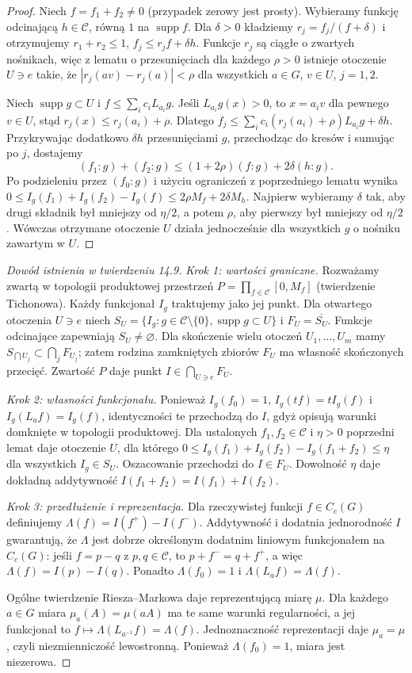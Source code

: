 \documentclass[11pt,a4paper]{article}
\numberwithin{equation}{section}
\theoremstyle{plain}
\theoremstyle{definition}
\theoremstyle{remark}
\newcommand{\supp}{\operatorname{supp}}
\begin{document}
\begin{proof}
Niech $f=f_1+f_2\ne0$ (przypadek zerowy jest prosty). Wybieramy funkcję odcinającą $h\in\mathcal C$, równą $1$ na $\supp f$. Dla $\delta>0$ kładziemy $r_j=f_j/(f+\delta)$ i otrzymujemy $r_1+r_2\le1$, $f_j\le r_jf+\delta h$. Funkcje $r_j$ są ciągłe o zwartych nośnikach, więc z lematu o przesunięciach dla każdego $\rho>0$ istnieje otoczenie $U\ni e$ takie, że $|r_j(av)-r_j(a)|<\rho$ dla wszystkich $a\in G$, $v\in U$, $j=1,2$.

Niech $\supp g\subset U$ i $f\le\sum_ic_iL_{a_i}g$. Jeśli $L_{a_i}g(x)>0$, to $x=a_iv$ dla pewnego $v\in U$, stąd $r_j(x)\le r_j(a_i)+\rho$. Dlatego
$f_j\le\sum_ic_i(r_j(a_i)+\rho)L_{a_i}g+\delta h$.
Przykrywając dodatkowo $\delta h$ przesunięciami $g$, przechodząc do kresów i sumując po $j$, dostajemy
\[
(f_1:g)+(f_2:g)\le(1+2\rho)(f:g)+2\delta(h:g).
\]
Po podzieleniu przez $(f_0:g)$ i użyciu ograniczeń z poprzedniego lematu wynika
$0\le I_g(f_1)+I_g(f_2)-I_g(f)\le2\rho M_f+2\delta M_h$. Najpierw wybieramy $\delta$ tak, aby drugi składnik był mniejszy od $\eta/2$, a potem $\rho$, aby pierwszy był mniejszy od $\eta/2$. Wówczas otrzymane otoczenie $U$ działa jednocześnie dla wszystkich $g$ o nośniku zawartym w $U$.
\end{proof}
\begin{proof}[Dowód istnienia w twierdzeniu 14.9]
\emph{Krok 1: wartości graniczne.} Rozważamy zwartą w topologii produktowej przestrzeń $P=\prod_{f\in\mathcal C}[0,M_f]$ (twierdzenie Tichonowa). Każdy funkcjonał $I_g$ traktujemy jako jej punkt. Dla otwartego otoczenia $U\ni e$ niech $S_U=\{I_g:g\in\mathcal C\setminus\{0\},\supp g\subset U\}$ i $F_U=\overline{S_U}$. Funkcje odcinające zapewniają $S_U\ne\varnothing$. Dla skończenie wielu otoczeń $U_1,\dots,U_m$ mamy $S_{\bigcap U_j}\subset\bigcap_j F_{U_j}$; zatem rodzina zamkniętych zbiorów $F_U$ ma własność skończonych przecięć. Zwartość $P$ daje punkt $I\in\bigcap_{U\ni e}F_U$.

\emph{Krok 2: własności funkcjonału.} Ponieważ $I_g(f_0)=1$, $I_g(tf)=tI_g(f)$ i $I_g(L_af)=I_g(f)$, identyczności te przechodzą do $I$, gdyż opisują warunki domknięte w topologii produktowej. Dla ustalonych $f_1,f_2\in\mathcal C$ i $\eta>0$ poprzedni lemat daje otoczenie $U$, dla którego $0\le I_g(f_1)+I_g(f_2)-I_g(f_1+f_2)\le\eta$ dla wszystkich $I_g\in S_U$. Oszacowanie przechodzi do $I\in F_U$. Dowolność $\eta$ daje dokładną addytywność $I(f_1+f_2)=I(f_1)+I(f_2)$.

\emph{Krok 3: przedłużenie i reprezentacja.} Dla rzeczywistej funkcji $f\in C_c(G)$ definiujemy $\Lambda(f)=I(f^+)-I(f^-)$. Addytywność i dodatnia jednorodność $I$ gwarantują, że $\Lambda$ jest dobrze określonym dodatnim liniowym funkcjonałem na $C_c(G)$: jeśli $f=p-q$ z $p,q\in\mathcal C$, to $p+f^-=q+f^+$, a więc $\Lambda(f)=I(p)-I(q)$. Ponadto $\Lambda(f_0)=1$ i $\Lambda(L_af)=\Lambda(f)$.

Ogólne twierdzenie Riesza--Markowa daje reprezentującą miarę $\mu$. Dla każdego $a\in G$ miara $\mu_a(A)=\mu(aA)$ ma te same warunki regularności, a jej funkcjonał to $f\mapsto\Lambda(L_{a^{-1}}f)=\Lambda(f)$. Jednoznaczność reprezentacji daje $\mu_a=\mu$, czyli niezmienniczość lewostronną. Ponieważ $\Lambda(f_0)=1$, miara jest niezerowa.
\end{proof}
\end{document}
